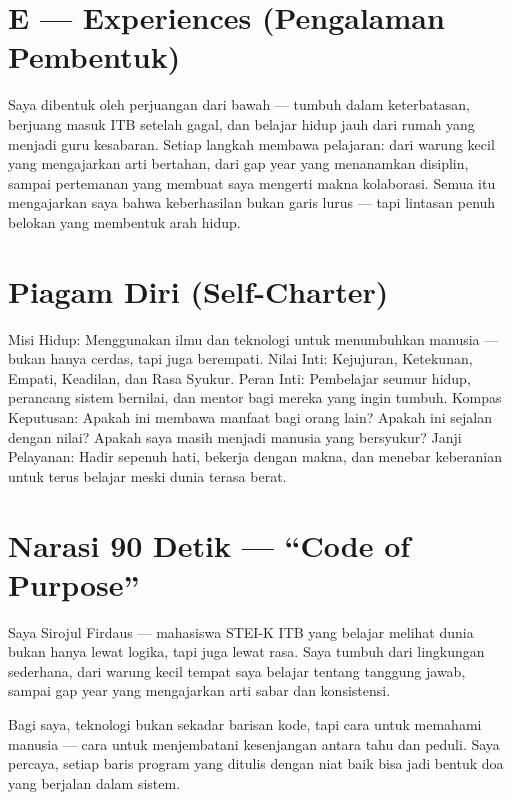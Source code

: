\documentclass[
  letterpaper,
  DIV=11,
  numbers=noendperiod]{scrreprt}
\begin{document}
\section{E --- Experiences (Pengalaman
Pembentuk)}\label{e-experiences-pengalaman-pembentuk}

Saya dibentuk oleh perjuangan dari bawah --- tumbuh dalam keterbatasan,
berjuang masuk ITB setelah gagal, dan belajar hidup jauh dari rumah yang
menjadi guru kesabaran. Setiap langkah membawa pelajaran: dari warung
kecil yang mengajarkan arti bertahan, dari gap year yang menanamkan
disiplin, sampai pertemanan yang membuat saya mengerti makna kolaborasi.
Semua itu mengajarkan saya bahwa keberhasilan bukan garis lurus --- tapi
lintasan penuh belokan yang membentuk arah hidup.

\section{Piagam Diri (Self-Charter)}\label{piagam-diri-self-charter}

Misi Hidup: Menggunakan ilmu dan teknologi untuk menumbuhkan manusia ---
bukan hanya cerdas, tapi juga berempati. Nilai Inti: Kejujuran,
Ketekunan, Empati, Keadilan, dan Rasa Syukur. Peran Inti: Pembelajar
seumur hidup, perancang sistem bernilai, dan mentor bagi mereka yang
ingin tumbuh. Kompas Keputusan: Apakah ini membawa manfaat bagi orang
lain? Apakah ini sejalan dengan nilai? Apakah saya masih menjadi manusia
yang bersyukur? Janji Pelayanan: Hadir sepenuh hati, bekerja dengan
makna, dan menebar keberanian untuk terus belajar meski dunia terasa
berat.

\section{Narasi 90 Detik --- ``Code of
Purpose''}\label{narasi-90-detik-code-of-purpose}

Saya Sirojul Firdaus --- mahasiswa STEI-K ITB yang belajar melihat dunia
bukan hanya lewat logika, tapi juga lewat rasa. Saya tumbuh dari
lingkungan sederhana, dari warung kecil tempat saya belajar tentang
tanggung jawab, sampai gap year yang mengajarkan arti sabar dan
konsistensi.

Bagi saya, teknologi bukan sekadar barisan kode, tapi cara untuk
memahami manusia --- cara untuk menjembatani kesenjangan antara tahu dan
peduli. Saya percaya, setiap baris program yang ditulis dengan niat baik
bisa jadi bentuk doa yang berjalan dalam sistem.
\end{document}
